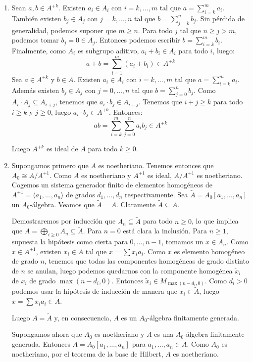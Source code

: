 \documentclass[twoside]{article}
\begin{document}
\begin{solucion}\mbox{}
\begin{enumerate}
	\item Sean $a,b \in A^{+k}$. Existen $a_i \in A_i$ con $i=k,\dots,m$ tal que $a = \sum_{i=k}^{m} a_i$. También existen $b_j \in A_j$ con $j=k,\dots,n$ tal que $b = \sum_{j=k}^n b_j$. Sin pérdida de generalidad, podemos suponer que $m≥n$. Para todo $j$ tal que $n≥j>m$, podemos tomar $b_j = 0 \in A_j$. Entonces podemos escribir $b = \sum_{i=k}^m b_i$. Finalmente, como $A_i$ es subgrupo aditivo, $a_i+b_i \in A_i$ para todo $i$, luego:
	\[ a + b = \sum_{i=1}^m (a_i + b_i) \in A^{+k}\]
	Sea $a \in A^{+k}$ y $b \in A$. Existen $a_i \in A_i$ con $i=k,\dots,m$ tal que $a = \sum_{i=k}^{m} a_i$. Además existen $b_j \in A_j$ con $j=0,\dots,n$ tal que $b = \sum_{j=0}^{n} b_j$. Como $A_i \cdot A_j \subseteq A_{i+j}$, tenemos que $a_i \cdot b_j \in A_{i+j}$. Tenemos que $i+j ≥ k$ para todo $i≥k$ y $j≥0$, luego $a_i \cdot b_j \in A^{+k}$. Entonces:
	\[ ab = \sum_{i=k}^{m} \sum_{j=0}^{n} a_i b_j \in A^{+k} \]

	Luego $A^{+k}$ es ideal de $A$ para todo $k≥0$.

	\item Supongamos primero que $A$ es noetheriano. Tenemos entonces que $A_0 \cong A/A^{+1}$. Como $A$ es noetheriano y $A^{+1}$ es ideal, $A/A^{+1}$ es noetheriano. Cogemos un sistema generador finito de elementos homogéneos de $A^{+1}=\langle a_1,\dots,a_n \rangle$ de grados $d_1,\dots,d_n$ respectivamente. Sea $\tilde{A}=A_0[a_1,\dots,a_n]$ un $A_0$-álgebra. Veamos que $\tilde{A}=A$. Claramente $\tilde{A} \subseteq A$.

	Demostraremos por inducción que $A_n \subseteq \tilde{A}$ para todo $n ≥ 0$, lo que implica que $A = \bigoplus_{i≥0} A_n \subseteq \tilde{A}$. 
	Para $n=0$ está clara la inclusión. Para $n≥1$, supuesta la hipótesis como cierta para $0,\dots,n-1$, tomamos un $x \in A_n$. Como $x \in A^{+1}$, existen $x_i \in A$ tal que $x = \sum x_i a_i$.
	Como $x$ es elemento homogéneo de grado $n$, tenemos que todas las componentes homogéneas de grado distinto de $n$ se anulan, luego podemos quedarnos con la componente homogénea $\tilde{x}_i$ de $x_i$ de grado $\max(n-d_i,0)$. Entonces $\tilde{x}_i \in M_{\max(n-d_i,0)}$. Como $d_i > 0$ podemos usar la hipótesis de inducción de manera que $x_i \in \tilde{A}$, luego $x=\sum x_ia_i \in \tilde{A}$.

	Luego $A=\tilde{A}$ y, en consecuencia, $A$ es un $A_0$-álgebra finitamente generada.

	Supongamos ahora que $A_0$ es noetheriano y $A$ es una $A_0$-álgebra finitamente generada. Entonces $A=A_0[a_1,\dots,a_n]$ para $a_1,\dots,a_n \in A$. Como $A_0$ es noetheriano, por el teorema de la base de Hilbert, $A$ es noetheriano.
\end{enumerate}
\end{solucion}
\end{document}
